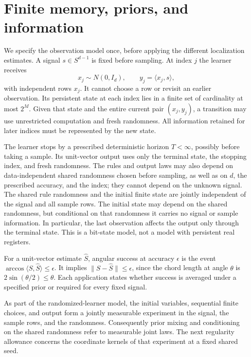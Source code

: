 \section{Finite memory, priors, and information}\label{l:model}

We specify the observation model once, before applying the different
localization estimates. A signal \(s\in S^{d-1}\) is fixed before
sampling. At index \(j\) the learner receives
\[
 x_j\sim N(0,I_d),\qquad y_j=\langle x_j,s\rangle,
\]
with independent rows \(x_j\). It cannot choose a row or revisit an
earlier observation. Its persistent state at each index lies in a
finite set of cardinality at most \(2^M\). Given that state and the
entire current pair \((x_j,y_j)\), a transition may use unrestricted
computation and fresh randomness. All information retained for later
indices must be represented by the new state.

The learner stops by a prescribed deterministic horizon \(T<\infty\),
possibly before taking a sample. Its unit-vector output uses only the
terminal state, the stopping index, and fresh randomness. The rules and
output laws may also depend on data-independent shared randomness
chosen before sampling, as well as on \(d\), the prescribed accuracy,
and the index; they cannot depend on the unknown signal. The shared
rule randomness and the initial finite state are jointly independent
of the signal and all sample rows. The initial state may depend on the
shared randomness, but conditional on that randomness it carries no
signal or sample information. In particular, the
last observation affects the output only through the terminal state.
This is a bit-state model, not a model with persistent real registers.

For a unit-vector estimate \(\widehat S\), angular success at
accuracy \(\epsilon\) is the event
\(\arccos\langle S,\widehat S\rangle\le\epsilon\).
It implies \(\|S-\widehat S\|\le\epsilon\), since the
chord length at angle \(\theta\) is \(2\sin(\theta/2)\le\theta\).
Each application states whether success is averaged under a specified
prior or required for every fixed signal.

As part of the randomized-learner model, the initial variables,
sequential finite choices, and output form a jointly measurable
experiment in the signal, the sample rows, and the randomness.
Consequently prior mixing and conditioning on the shared randomness
refer to measurable joint laws. The next regularity allowance concerns
the coordinate kernels of that experiment at a fixed shared seed.

